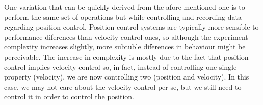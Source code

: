 One variation that can be quickly derived from the afore mentioned one is to perform the same set of operations but while controlling and recording data regarding position control.
Position control systems are typically more sensible to performance diferences than velocity control ones, so although the experiment complexity increases slightly, more subtuble diferences in behaviour might be perceivable.
The increase in complexity is mostly due to the fact that position control implies velocity control so, in fact, instead of controlling one single property (velocity), we are now controlling two (position and velocity).
In this case, we may not care about the velocity control per se, but we still need to control it in order to control the position.


